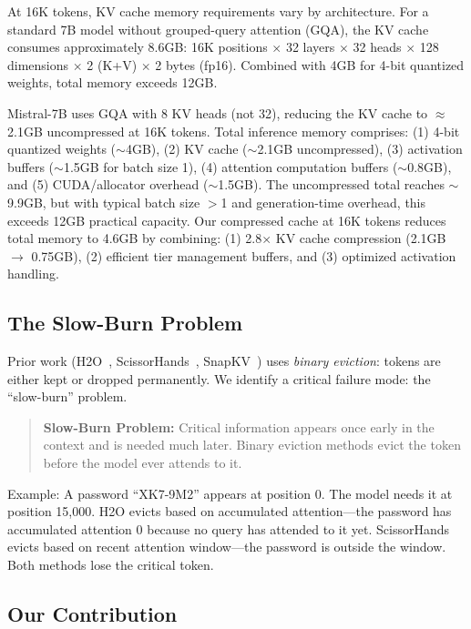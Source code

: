 \documentclass[11pt]{article}
\begin{document}
At 16K tokens, KV cache memory requirements vary by architecture. For a standard 7B model without grouped-query attention (GQA), the KV cache consumes approximately 8.6GB: 16K positions $\times$ 32 layers $\times$ 32 heads $\times$ 128 dimensions $\times$ 2 (K+V) $\times$ 2 bytes (fp16). Combined with 4GB for 4-bit quantized weights, total memory exceeds 12GB.

Mistral-7B uses GQA with 8 KV heads (not 32), reducing the KV cache to $\approx$2.1GB uncompressed at 16K tokens. Total inference memory comprises: (1) 4-bit quantized weights ($\sim$4GB), (2) KV cache ($\sim$2.1GB uncompressed), (3) activation buffers ($\sim$1.5GB for batch size 1), (4) attention computation buffers ($\sim$0.8GB), and (5) CUDA/allocator overhead ($\sim$1.5GB). The uncompressed total reaches $\sim$9.9GB, but with typical batch size $>$1 and generation-time overhead, this exceeds 12GB practical capacity. Our compressed cache at 16K tokens reduces total memory to 4.6GB by combining: (1) 2.8$\times$ KV cache compression (2.1GB $\rightarrow$ 0.75GB), (2) efficient tier management buffers, and (3) optimized activation handling.

\subsection{The Slow-Burn Problem}

Prior work (H2O~\cite{h2o}, ScissorHands~\cite{scissorhands}, SnapKV~\cite{snapkv}) uses \textit{binary eviction}: tokens are either kept or dropped permanently. We identify a critical failure mode: the ``slow-burn'' problem.

\begin{quote}
\textbf{Slow-Burn Problem:} Critical information appears once early in the context and is needed much later. Binary eviction methods evict the token before the model ever attends to it.
\end{quote}

Example: A password ``XK7-9M2'' appears at position 0. The model needs it at position 15,000. H2O evicts based on accumulated attention---the password has accumulated attention 0 because no query has attended to it yet. ScissorHands evicts based on recent attention window---the password is outside the window. Both methods lose the critical token.

\subsection{Our Contribution}
\end{document}
